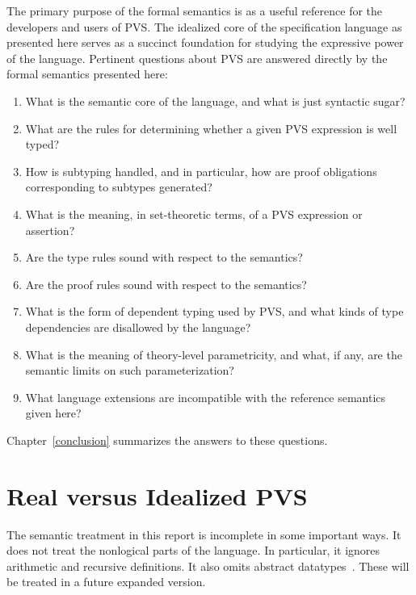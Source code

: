 \documentclass [12pt,twoside]{cslreport}
\begin{document}
The primary purpose of the formal semantics is as a useful reference for
the developers and users of PVS\@.  The idealized core of the
specification language as presented here serves as a succinct foundation
for studying the expressive power of the language.  Pertinent questions
about PVS are answered directly by the formal semantics presented here:
\begin{enumerate}
\item\label{one} What is the semantic core of the language, and what is
just syntactic sugar?

\item\label{two} What are the rules for determining whether a given PVS
expression is well typed?

\item\label{three} How is subtyping handled, and in particular, how are
proof obligations corresponding to subtypes generated?

\item\label{four} What is the meaning, in set-theoretic terms, of a PVS expression or
assertion?

\item\label{five} Are the type rules sound with respect to the semantics? 

\item\label{six} Are the proof rules sound with respect to the semantics?

\item\label{seven} What is the form of dependent typing used by PVS, and
what kinds of type dependencies are disallowed by the language?

\item\label{eight} What is the meaning of theory-level parametricity, and
what, if any, are the semantic limits on such parameterization?

\item\label{nine} What language extensions are incompatible with the reference
semantics given here?
\end{enumerate}

Chapter~\ref{conclusion} summarizes the answers to these questions.


\section{Real versus Idealized PVS}

The semantic treatment in this report is incomplete in some important ways.
It does not treat the nonlogical parts of the language.  In particular,
it ignores arithmetic and recursive definitions.  It also omits
abstract datatypes~\cite{Shankar:ADT}.  These will be treated in a future
expanded version. 
\end{document}
